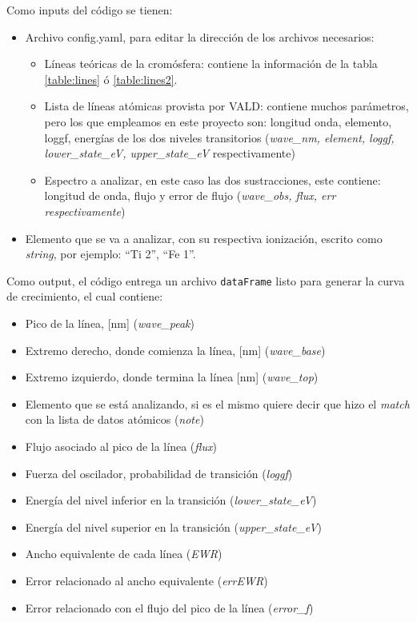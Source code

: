 \documentclass[12pt,oneside,openany,letter]{book}
\begin{document}
Como inputs del código se tienen:
\begin{itemize}
    \item Archivo config.yaml, para editar la dirección de los archivos necesarios:
    \begin{itemize}
        \item Líneas teóricas de la cromósfera: contiene la información de la tabla \ref{table:lines} ó \ref{table:lines2}.
        \item Lista de líneas atómicas provista por VALD: contiene muchos parámetros, pero los que empleamos en este proyecto son: longitud onda, elemento, loggf, energías de los dos niveles transitorios (\textit{wave\_nm, element, loggf, lower\_state\_eV, upper\_state\_eV} respectivamente)
        \item Espectro a analizar, en este caso las dos sustracciones, este contiene: longitud de onda, flujo y error de flujo (\textit{wave\_obs, flux, err respectivamente})
    \end{itemize}
    
    \item Elemento que se va a analizar, con su respectiva ionización, escrito como \textit{string}, por ejemplo: ``Ti 2'', ``Fe 1''.
\end{itemize}

Como output, el código entrega un archivo \texttt{dataFrame} listo para generar la curva de crecimiento, el cual contiene:

\begin{itemize}
    \item Pico de la línea, [nm] (\textit{wave\_peak})
    \item Extremo derecho, donde comienza la línea, [nm] (\textit{wave\_base})
    \item Extremo izquierdo, donde termina la línea [nm] (\textit{wave\_top})
    \item Elemento que se está analizando, si es el mismo quiere decir que hizo el \textit{match} con la lista de datos atómicos (\textit{note})
    \item Flujo asociado al pico de la línea (\textit{flux})
    \item Fuerza del oscilador, probabilidad de transición (\textit{loggf})
    \item Energía del nivel inferior en la transición (\textit{lower\_state\_eV})
    \item Energía del nivel superior en la transición (\textit{upper\_state\_eV})
    \item Ancho equivalente de cada línea (\textit{EWR})
    \item Error relacionado al ancho equivalente (\textit{errEWR})
    \item Error relacionado con el flujo del pico de la línea (\textit{error\_f})
\end{itemize}
\end{document}
